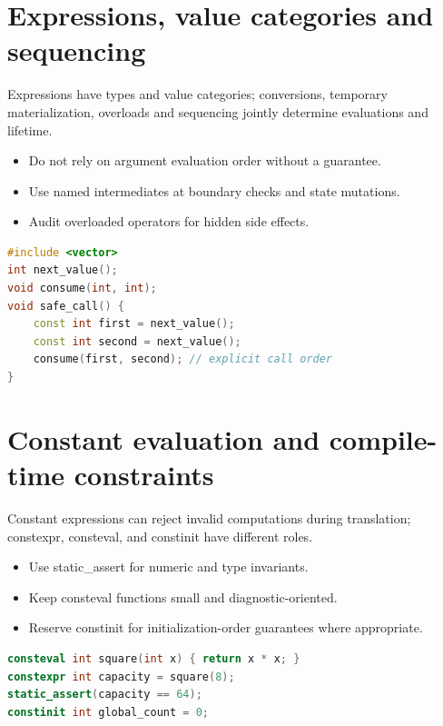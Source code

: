 \documentclass[11pt]{article}
\begin{document}
\section{Expressions, value categories and sequencing}
Expressions have types and value categories; conversions, temporary materialization, overloads and sequencing jointly determine evaluations and lifetime.

\begin{itemize}[leftmargin=*,itemsep=1pt,topsep=3pt]
\item Do not rely on argument evaluation order without a guarantee.
\item Use named intermediates at boundary checks and state mutations.
\item Audit overloaded operators for hidden side effects.
\end{itemize}
\begin{lstlisting}[language=C++]
#include <vector>
int next_value();
void consume(int, int);
void safe_call() {
    const int first = next_value();
    const int second = next_value();
    consume(first, second); // explicit call order
}
\end{lstlisting}
\section{Constant evaluation and compile-time constraints}
Constant expressions can reject invalid computations during translation; constexpr, consteval, and constinit have different roles.

\begin{itemize}[leftmargin=*,itemsep=1pt,topsep=3pt]
\item Use static\_assert for numeric and type invariants.
\item Keep consteval functions small and diagnostic-oriented.
\item Reserve constinit for initialization-order guarantees where appropriate.
\end{itemize}
\begin{lstlisting}[language=C++]
consteval int square(int x) { return x * x; }
constexpr int capacity = square(8);
static_assert(capacity == 64);
constinit int global_count = 0;
\end{lstlisting}
\end{document}
